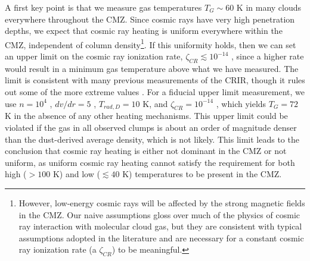 
A first key point is that we measure gas temperatures $T_G\sim60$ K in many
clouds everywhere throughout the CMZ.  Since cosmic rays have very high
penetration depths, we expect that cosmic ray heating is uniform
everywhere within the CMZ, independent of column density\footnote{However,
low-energy cosmic rays will be affected by the strong magnetic fields in the
CMZ.  Our naive assumptions gloss over much of the physics of cosmic ray
interaction with molecular cloud gas, but they are consistent with typical
assumptions adopted in the literature and are necessary for a constant cosmic
ray ionization rate (a $\zeta_{CR}$) to be meaningful.}.  If this uniformity
holds, then we can set an upper limit on the cosmic ray ionization rate,
$\zeta_{CR} \lesssim 10^{-14}$ \pers, since a higher rate would result in a
minimum gas temperature above what we have measured.  The limit is consistent
with many previous measurements of the CRIR, though
it rules out some of the more extreme values \citep{Yusef-Zadeh2013b,Goto2013a}.
For a fiducial upper limit measurement, we use $n=10^{4}$ \percc, $dv/dr=5$
\kms \perpc, $T_{rad,D}=10$ K, and $\zeta_{CR} = 10^{-14}$ \pers, which
yields $T_{G}=72$ K in the absence of any other heating mechanisms.  This
upper limit could be violated if the gas in all observed clumps is about an
order of magnitude denser than the dust-derived average density, which is not
likely.  This limit leads to the conclusion that cosmic ray heating is either
not dominant in the CMZ or not uniform, as uniform cosmic ray heating cannot
satisfy the requirement for both high ($>100$ K) and low ($\lesssim40$ K)
temperatures to be present in the CMZ.



